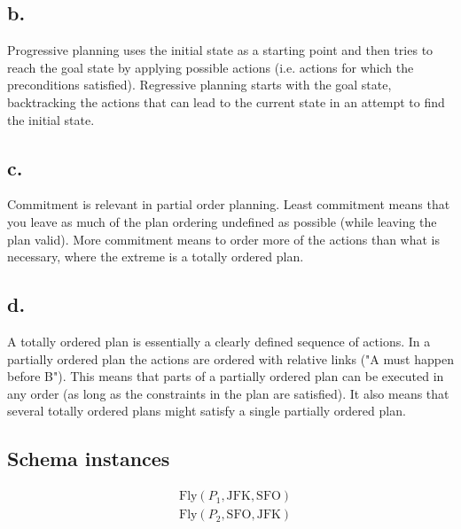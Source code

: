 \documentclass[a4paper, english, 11pt]{article}
\begin{document}
\subsection*{b.}
Progressive planning uses the initial state as a starting point and then tries
to reach the goal state by applying possible actions (i.e. actions for which
the preconditions satisfied). Regressive planning starts with the goal state,
backtracking the actions that can lead to the current state in an attempt to
find the initial state.

\subsection*{c.}
Commitment is relevant in partial order planning. Least commitment means that
you leave as much of the plan ordering undefined as possible (while leaving the
plan valid). More commitment means to order more of the actions than what is
necessary, where the extreme is a totally ordered plan.

\subsection*{d.}
A totally ordered plan is essentially a clearly defined sequence of actions.
In a partially ordered plan the actions are ordered with relative links ("A
must happen before B"). This means that parts of a partially ordered plan can
be executed in any order (as long as the constraints in the plan are
satisfied). It also means that several totally ordered plans might satisfy a
single partially ordered plan.

\subsection*{Schema instances}
\begin{align*}
    &\mathrm{Fly}(P_1, \mathrm{JFK}, \mathrm{SFO})\\
    &\mathrm{Fly}(P_2, \mathrm{SFO}, \mathrm{JFK})\\
\end{align*}
\end{document}
